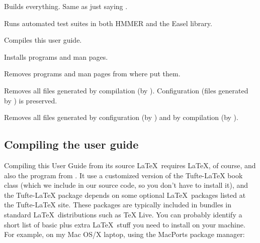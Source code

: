 \begin{sreitems}{}

\item[\monob{all}]
  Builds everything. Same as just saying .

\item[\monob{check}]
  Runs automated test suites in both HMMER and the Easel library.

\item[\monob{pdf}]
  Compiles this user guide.

\item[\monob{install}]
  Installs programs and man pages.

\item[\monob{uninstall}]
  Removes programs and man pages from where  put them.

\item[\monob{clean}] Removes all files generated by compilation (by
  ). Configuration (files generated by )
  is preserved.

\item[\monob{distclean}]
  Removes all files generated by configuration (by )
  and by compilation (by ). 

\end{sreitems}


\subsection{Compiling the user guide}

Compiling this User Guide from its source \LaTeX\ requires \LaTeX, of
course, and also the  program from
.
It use a customized version of the
Tufte-LaTeX book class
(which we include in our source code, so you don't have to
install it), and the Tufte-LaTeX package depends on some optional \LaTeX\ packages
listed at the
Tufte-LaTeX site.
These packages are typically included in bundles in
standard \LaTeX\ distributions such as
TeX Live.
You can probably
identify a short list of basic plus extra \LaTeX\ stuff you need to install on your machine. For
example, on my Mac OS/X laptop, using the MacPorts
package manager:


